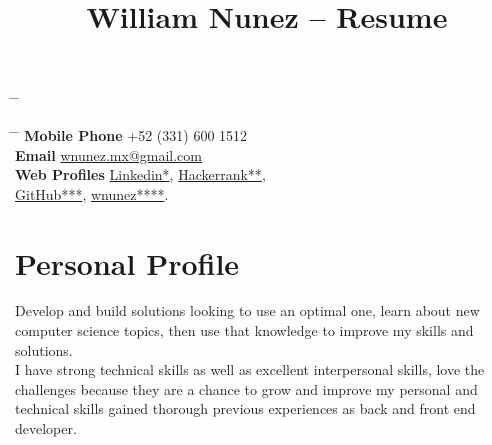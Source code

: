\documentclass[10pt]{article} %
\begin{document}

\title{William Nunez -- Resume} %


\parbox{0.5\textwidth}{ %
\begin{tabbing} %
\hspace{3cm} \= \hspace{4cm} \= \kill %
\end{tabbing}}
\hfill %
\parbox{0.5\textwidth}{ %
\begin{tabbing} %
\hspace{3cm} \= \hspace{4cm} \= \kill %
{\bf Mobile Phone} \> +52 (331) 600 1512 \\ %
{\bf Email} \> \href{mailto:wnunez.mx@gmail.com}{wnunez.mx@gmail.com} \\ %
{\bf Web Profiles} \> \href{https://mx.linkedin.com/in/wllmnc}{Linkedin*}, \href{https://www.hackerrank.com/wnunez}{Hackerrank**}, \\
\> \href{//https://github.com/wllmnc}{GitHub***}, \href{http://www.wnunez.com}{wnunez****}.
\end{tabbing}}


\section{Personal Profile}
Develop and build solutions looking to use an optimal one, learn about new computer science topics, then use that knowledge to improve my skills and solutions.\\
I have strong technical skills as well as excellent interpersonal skills, love the challenges because they are a chance to grow and improve my personal and technical skills gained thorough previous experiences as back and front end developer. 

\end{document}
